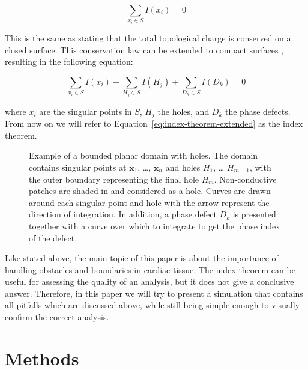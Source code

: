 \documentclass[twocolumn]{article}
\begin{document}
\begin{equation}
  \sum_{x_i \in S} I(x_i) = 0
  \label{eq:index-theorem}
\end{equation}

\noindent This is the same as stating that the total topological charge is
conserved on a closed surface.
This conservation law can be extended to compact surfaces \autocite{herlin2012reconstruction, davidsen2004topological},
resulting in the following equation:

\begin{equation}
  \sum_{x_i \in S} I(x_i) + \sum_{H_j \in S} I(H_j) + \sum_{D_k \in S} I(D_k)  = 0
  \label{eq:index-theorem-extended}
\end{equation}

\noindent where \(x_i\) are the singular points in \(S\),
\(H_j\) the holes,
and \(D_k\) the phase defects.
From now on we will refer to Equation~\ref{eq:index-theorem-extended} as the index theorem.

\begin{figure}[ht]
  \centering
  \caption{Example of a bounded planar domain with holes. The domain
    contains singular points at \(\pmb{x}_1\), \ldots, \(\pmb{x}_n\) and
    holes \(H_1\), \ldots{} \(H_{m-1}\), with the outer boundary
    representing the final hole \(H_m\).
    Non-conductive patches are shaded in and considered as a hole.
    Curves are drawn around each singular point and hole
    with the arrow represent the direction of integration.
    In addition, a phase defect $D_k$ is presented
    together with a curve over which to integrate to get the phase index of the defect.
  }
  \label{fig:index_calculation}
\end{figure}

\vspace{2em}

\noindent Like stated above, the main topic of this paper is about the importance
of handling obstacles and boundaries in cardiac tissue.
The index theorem can be useful for assessing the quality of an analysis,
but it does not give a conclusive answer.
Therefore, in this paper we will try to present a simulation
that contains all pitfalls which are discussed above,
while still being simple enough to visually confirm the correct analysis.

\section{Methods}\label{methods}
\end{document}
